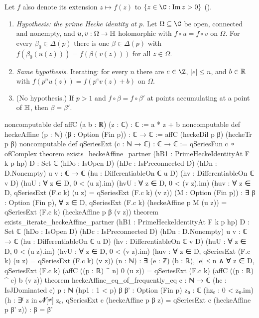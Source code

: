 \begin{theorem}\label{ch19:thm:partner}
Let $f$ also denote its extension $z\mapsto f(z)$ to $\{z\in\C:\operatorname{Im}z>0\}$ ().
\begin{enumerate}[label=(\alph*)]
\item \emph{Hypothesis: the prime Hecke identity at $p$.}  Let $\Omega\subseteq\C$ be open, connected and nonempty, and
  $u,v:\Omega\to\mathbb{H}$ holomorphic with $f\circ u=f\circ v$ on $\Omega$.  For every $\beta_0\in\Delta(p)$ there is one $\beta\in\Delta(p)$
  with $f(\beta_0(u(z)))=f(\beta(v(z)))$ for all $z\in\Omega$.
\item \emph{Same hypothesis.}  Iterating: for every $n$ there are $e\in\Z$, $|e|\le n$, and $b\in\mathbb{R}$ with
  $f(p^nu(z))=f(p^ev(z)+b)$ on $\Omega$.
\item (No hypothesis.)  If $p>1$ and $f\circ\beta=f\circ\beta'$ at points accumulating at a point of $\mathbb{H}$, then $\beta=\beta'$.
\end{enumerate}
\end{theorem}
\begin{leancode}
noncomputable def affC (a b : ℝ) (z : ℂ) : ℂ := a * z + b
noncomputable def heckeAffine (p : ℕ) (β : Option (Fin p)) : ℂ → ℂ :=
  affC (heckeDil p β) (heckeTr p β)
noncomputable def qSeriesExt (c : ℕ → ℂ) : ℂ → ℂ :=
  qSeriesFun c ∘ ofComplex
theorem exists_heckeAffine_partner (hB1 : PrimeHeckeIdentityAt F k p hp) {D : Set ℂ}
    (hDo : IsOpen D) (hDc : IsPreconnected D) (hDn : D.Nonempty) {u v : ℂ → ℂ}
    (hu : DifferentiableOn ℂ u D) (hv : DifferentiableOn ℂ v D)
    (huU : ∀ z ∈ D, 0 < (u z).im) (hvU : ∀ z ∈ D, 0 < (v z).im)
    (huv : ∀ z ∈ D, qSeriesExt (F.c k) (u z) = qSeriesExt (F.c k) (v z)) (M : Option (Fin p)) :
    ∃ β : Option (Fin p), ∀ z ∈ D,
      qSeriesExt (F.c k) (heckeAffine p M (u z)) = qSeriesExt (F.c k) (heckeAffine p β (v z))
theorem exists_iterate_heckeAffine_partner (hB1 : PrimeHeckeIdentityAt F k p hp) {D : Set ℂ}
    (hDo : IsOpen D) (hDc : IsPreconnected D) (hDn : D.Nonempty) {u v : ℂ → ℂ}
    (hu : DifferentiableOn ℂ u D) (hv : DifferentiableOn ℂ v D)
    (huU : ∀ z ∈ D, 0 < (u z).im) (hvU : ∀ z ∈ D, 0 < (v z).im)
    (huv : ∀ z ∈ D, qSeriesExt (F.c k) (u z) = qSeriesExt (F.c k) (v z)) (n : ℕ) :
    ∃ (e : ℤ) (b : ℝ), |e| ≤ n ∧ ∀ z ∈ D,
      qSeriesExt (F.c k) (affC ((p : ℝ) ^ n) 0 (u z)) =
        qSeriesExt (F.c k) (affC ((p : ℝ) ^ e) b (v z))
theorem heckeAffine_eq_of_frequently_eq {c : ℕ → ℂ} (hc : IsJDominated c) {p : ℕ} (hp1 : 1 < p)
    {β β' : Option (Fin p)} {z₀ : ℂ} (hz₀ : 0 < z₀.im)
    (h : ∃ᶠ z in 𝓝[≠] z₀, qSeriesExt c (heckeAffine p β z) = qSeriesExt c (heckeAffine p β' z)) :
    β = β'
\end{leancode}
